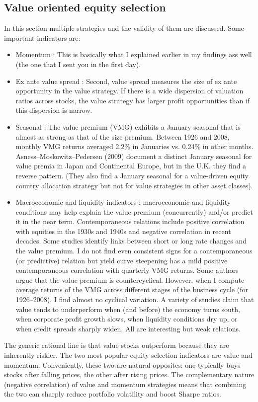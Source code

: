\documentclass[12 pt]{article}
\begin{document}
\subsection{Value oriented equity selection}
In this section multiple strategies and the validity of them are discussed. Some important indicators are: 
\begin{itemize}
\item Momentum : This is basically what I explained earlier in my findings ass well (the one that I sent you in the first day). 
\item Ex ante value spread : Second, value spread measures the size of ex ante opportunity in the value strategy. If there is a wide dispersion of valuation ratios across stocks, the value strategy has larger profit opportunities than if this dispersion is narrow.
\item Seasonal : The value premium (VMG) exhibits a January seasonal that is almost as strong as that of the size premium. Between 1926 and
2008, monthly VMG returns averaged 2.2\% in Januaries vs. 0.24\% in other months. Asness–Moskowitz–Pedersen (2009) document a distinct January seasonal for value premia in Japan and Continental Europe, but in the U.K. they find a reverse pattern. (They also find a January seasonal for a value-driven equity country allocation strategy but not for value strategies in other asset classes). 
\item Macroeconomic and liquidity indicators : macroeconomic and liquidity conditions may help explain the value premium (concurrently) and/or predict it in the near term.
Contemporaneous relations include positive correlation with equities in the 1930s and 1940s and negative correlation in recent decades. Some
studies identify links between short or long rate changes and the value premium. I do not find even consistent signs for a contemporaneous  (or predictive) relation but yield curve steepening has a mild positive contemporaneous correlation with quarterly VMG returns. Some  authors argue that the value premium is countercyclical. However, when I compute average returns of the VMG across different stages of the business cycle (for 1926–2008), I find almost no cyclical variation. A variety of studies claim that value tends to underperform when (and before) the economy turns south, when corporate profit growth slows, when liquidity conditions dry up, or when credit spreads sharply widen. All are interesting but  weak relations. 
\end{itemize}
The generic rational line is that value stocks outperform because they are inherently riskier. The two most popular equity selection indicators are value and momentum. Conveniently, these two are natural opposites: one typically buys stocks after falling prices, the other after rising prices. The complementary nature (negative correlation) of value and momentum strategies means that combining the two can sharply reduce portfolio volatility and boost Sharpe ratios.
\end{document}
